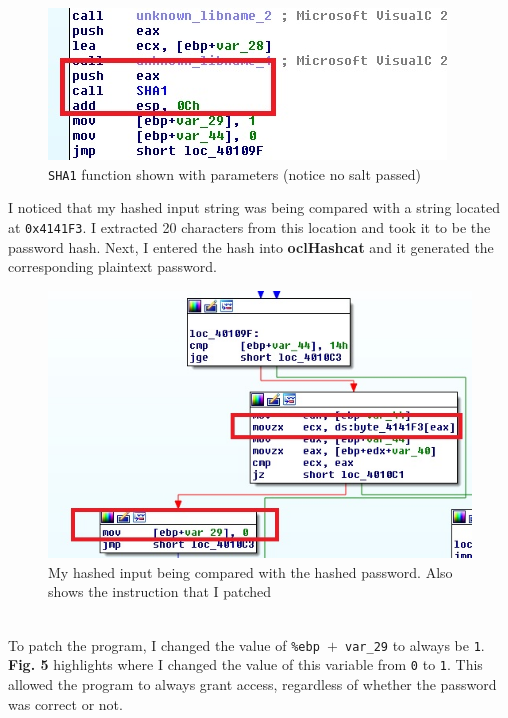 \documentclass[conference]{IEEEtran}
\begin{document}
\begin{figure}[h]
\includegraphics[width=\columnwidth]{image4.jpg}
\caption{\texttt{SHA1} function shown with parameters (notice no salt passed)}
\centering
\end{figure}\mbox{}

I noticed that my hashed input string was being compared with a string located at \texttt{0x4141F3}. I extracted 20 characters from this location and took it to be the password hash. Next, I entered the hash into \textbf{oclHashcat} and it generated the corresponding plaintext password.

\begin{figure}[h]
\includegraphics[width=\columnwidth]{image5.jpg}
\caption{My hashed input being compared with the hashed password. Also shows the instruction that I patched}
\centering
\end{figure}\mbox{}\\

To patch the program, I changed the value of \texttt{\%ebp $+$ var\_29} to always be \texttt{1}. \textbf{Fig. 5} highlights where I changed the value of this variable from \texttt{0} to \texttt{1}. This allowed the program to always grant access, regardless of whether the password was correct or not.\\
\end{document}
